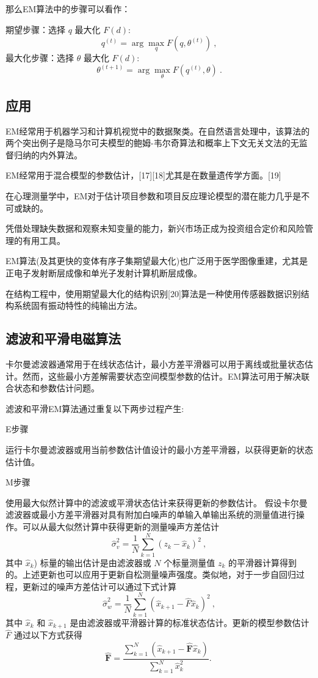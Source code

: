 那么EM算法中的步骤可以看作：

期望步骤：选择 $q$ 最大化 $F(d)$:
$$q^{(t)} = \arg \max_q F(q, \theta^{(t)})~,$$
最大化步骤：选择 $\theta$ 最大化 $F(d)$:
$$\theta^{(t+1)} = \arg \max_\theta F(q^{(t)}, \theta)~.$$

\subsection{应用}

EM经常用于机器学习和计算机视觉中的数据聚类。在自然语言处理中，该算法的两个突出例子是隐马尔可夫模型的鲍姆-韦尔奇算法和概率上下文无关文法的无监督归纳的内外算法。

EM经常用于混合模型的参数估计，[17][18]尤其是在数量遗传学方面。[19]

在心理测量学中，EM对于估计项目参数和项目反应理论模型的潜在能力几乎是不可或缺的。

凭借处理缺失数据和观察未知变量的能力，新兴市场正成为投资组合定价和风险管理的有用工具。

EM算法(及其更快的变体有序子集期望最大化)也广泛用于医学图像重建，尤其是正电子发射断层成像和单光子发射计算机断层成像。

在结构工程中，使用期望最大化的结构识别[20]算法是一种使用传感器数据识别结构系统固有振动特性的纯输出方法。

\subsection{滤波和平滑电磁算法}

卡尔曼滤波器通常用于在线状态估计，最小方差平滑器可以用于离线或批量状态估计。然而，这些最小方差解需要状态空间模型参数的估计。EM算法可用于解决联合状态和参数估计问题。

滤波和平滑EM算法通过重复以下两步过程产生:

E步骤

运行卡尔曼滤波器或用当前参数估计值设计的最小方差平滑器，以获得更新的状态估计值。

M步骤

使用最大似然计算中的滤波或平滑状态估计来获得更新的参数估计。
假设卡尔曼滤波器或最小方差平滑器对具有附加白噪声的单输入单输出系统的测量值进行操作。可以从最大似然计算中获得更新的测量噪声方差估计
\begin{equation}
\hat\sigma_v^2 = \frac{1}{N} \sum_{k=1}^{N} \left( z_k - \hat{x}_k \right)^2~,
\end{equation}
其中 $\hat{x}_k$) 标量的输出估计是由滤波器或 $N$ 个标量测量值 $z_k$ 的平滑器计算得到的。上述更新也可以应用于更新自松测量噪声强度。类似地，对于一步自回归过程，更新过的噪声方差估计可以通过下式计算
\begin{equation}
\hat\sigma_w^2 = \frac{1}{N} \sum_{k=1}^{N} \left( \hat{x}_{k+1} - \hat{F} \hat{x}_k \right)^2~,
\end{equation}
其中 $\hat{x}_k$ 和 $\hat{x}_{k+1}$ 是由滤波器或平滑器计算的标准状态估计。更新的模型参数估计 $\hat{F}$ 通过以下方式获得
\begin{equation}
\hat{\mathbf{F}} = \frac{\sum_{k=1}^{N} (\hat{x}_{k+1} - \hat{\mathbf{F}} \hat{x}_{k})}{\sum_{k=1}^{N} \hat{x}_{k}^{2}}.~
\end{equation}

